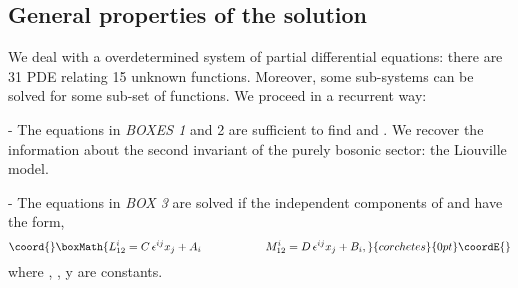 \documentclass[a4paper,11pt,twoside]{article}
\begin{document}
\begin{center}
\end{center}






\subsection{General properties of the solution}
We deal with a overdetermined system of partial differential
equations: there are 31 PDE relating 15 unknown functions.
Moreover, some sub-systems can be solved for some sub-set of
functions. We proceed in a recurrent way:

\vspace*{0.1cm}

- \coordHE{} The equations in {\it BOXES 1} and {2} are sufficient to
find  \coordHE{} and \coordHE{}. We recover the information about the
second invariant of the purely bosonic sector: the Liouville
model.

\vspace*{0.1cm}

- \coordHE{} The equations in {\it BOX 3} are solved if the independent
components of \coordHE{} and \coordHE{} have the form,
\[\coord{}\boxMath{
L^i_{12}=C\, \epsilon^{ij} x_j +A_i \hspace{2cm} M^i_{12}=D \,
\epsilon^{ij} x_j +B_i ,
}{corchetes}{0pt}\coordE{}\]
where \coordHE{}, \coordHE{}, \coordHE{} y \coordHE{} are constants.
\end{document}
